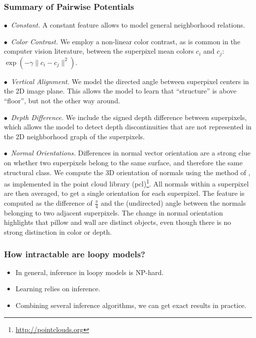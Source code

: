 \documentclass[final,ignorenonframetext,compress]{beamer}
\begin{document}
    \begin{frame}
        \frametitle{Summary of Pairwise Potentials}
            \noindent\emph{$\bullet$~Constant.}
                A constant feature allows to model general neighborhood relations.


            \noindent\emph{$\bullet$~Color Contrast.}
                We employ a non-linear color contrast, as is common in the computer
                vision literature, between the superpixel mean colors $c_i$ and $c_j$:
                $\exp\left(-\gamma \lVert c_i - c_j \rVert^2\right)$.


            \noindent\emph{$\bullet$~Vertical Alignment.}
                We model the directed angle between superpixel centers in the 2D image
                plane.  This allows the  model to learn that ``structure'' is above
                ``floor'', but not the other way around.


            \noindent\emph{$\bullet$~Depth Difference.}
                We include the signed depth difference between superpixels, which
                allows the model to detect depth discontinuities that are not
                represented in the 2D neighborhood graph of the superpixels.


            \noindent\emph{$\bullet$~Normal Orientations.}
                Differences in normal vector orientation are a strong clue on
                whether two superpixels belong to the same surface, and therefore the
                same structural class.
                We compute the 3D orientation of normals using the method of \citet{holz_2011_robocup},
                as implemented in the point cloud library (pcl)\footnote{\url{http://pointclouds.org}}.
                All normals within a superpixel are then averaged, to get a single orientation for each superpixel.
                The feature is computed as the difference of $\frac{\pi}{4}$ and the (undirected) angle between the normals belonging
                to two adjacent superpixels.  
                The change
                in normal orientation highlights that pillow and wall are distinct
                objects, even though there is no strong distinction in color or depth.
    \end{frame}

    \begin{frame}
        \frametitle{How intractable are loopy models?}
        \begin{itemize}
            \item In general, inference in loopy models is NP-hard.
            \item Learning relies on inference.
            \item Combining several inference algorithms, we can get exact results in practice. %
        \end{itemize}
    \end{frame}
\end{document}
